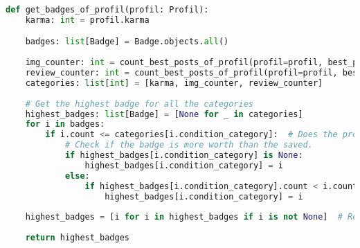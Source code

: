 \begin{lstlisting}[language=Python]
def get_badges_of_profil(profil: Profil):
    karma: int = profil.karma

    badges: list[Badge] = Badge.objects.all()
    
    img_counter: int = count_best_posts_of_profil(profil=profil, best_post_function=get_all_images_sorted)
    review_counter: int = count_best_posts_of_profil(profil=profil, best_post_function=get_all_reviews_sorted)
    categories: list[int] = [karma, img_counter, review_counter]
    
    # Get the highest badge for all the categories
    highest_badges: list[Badge] = [None for _ in categories]
    for i in badges:
        if i.count <= categories[i.condition_category]:  # Does the profil have this badge
            # Check if the badge is more worth than the saved.
            if highest_badges[i.condition_category] is None:
                highest_badges[i.condition_category] = i
            else:
                if highest_badges[i.condition_category].count < i.count:
                    highest_badges[i.condition_category] = i
    
    highest_badges = [i for i in highest_badges if i is not None]  # Remove all None
    
    return highest_badges

\end{lstlisting}